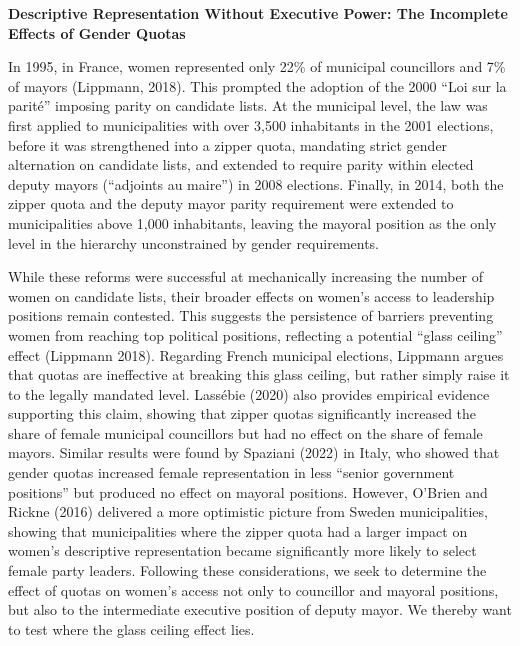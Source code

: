 \documentclass[11pt,a4paper]{article}
\makeatletter
\renewcommand{\section}{\@startsection{section}{1}{0pt}{1.4em}{0.6em}{\normalfont\bfseries}}
\makeatother
\begin{document}
\begin{center}
  {\large\bfseries Descriptive Representation Without Executive Power: The Incomplete Effects of Gender Quotas}
\end{center}

\section{INTRODUCTION}

In 1995, in France, women represented only 22\% of municipal councillors and 7\% of mayors (Lippmann, 2018). This prompted the adoption of the 2000 ``Loi sur la parité'' imposing parity on candidate lists. At the municipal level, the law was first applied to municipalities with over 3,500 inhabitants in the 2001 elections, before it was strengthened into a zipper quota, mandating strict gender alternation on candidate lists, and extended to require parity within elected deputy mayors (``adjoints au maire'') in 2008 elections. Finally, in 2014, both the zipper quota and the deputy mayor parity requirement were extended to municipalities above 1,000 inhabitants, leaving the mayoral position as the only level in the hierarchy unconstrained by gender requirements.

While these reforms were successful at mechanically increasing the number of women on candidate lists, their broader effects on women's access to leadership positions remain contested. This suggests the persistence of barriers preventing women from reaching top political positions, reflecting a potential ``glass ceiling'' effect (Lippmann 2018). Regarding French municipal elections, Lippmann argues that quotas are ineffective at breaking this glass ceiling, but rather simply raise it to the legally mandated level. Lassébie (2020) also provides empirical evidence supporting this claim, showing that zipper quotas significantly increased the share of female municipal councillors but had no effect on the share of female mayors. Similar results were found by Spaziani (2022) in Italy, who showed that gender quotas increased female representation in less ``senior government positions'' but produced no effect on mayoral positions. However, O'Brien and Rickne (2016) delivered a more optimistic picture from Sweden municipalities, showing that municipalities where the zipper quota had a larger impact on women's descriptive representation became significantly more likely to select female party leaders. Following these considerations, we seek to determine the effect of quotas on women's access not only to councillor and mayoral positions, but also to the intermediate executive position of deputy mayor. We thereby want to test where the glass ceiling effect lies.
\end{document}
